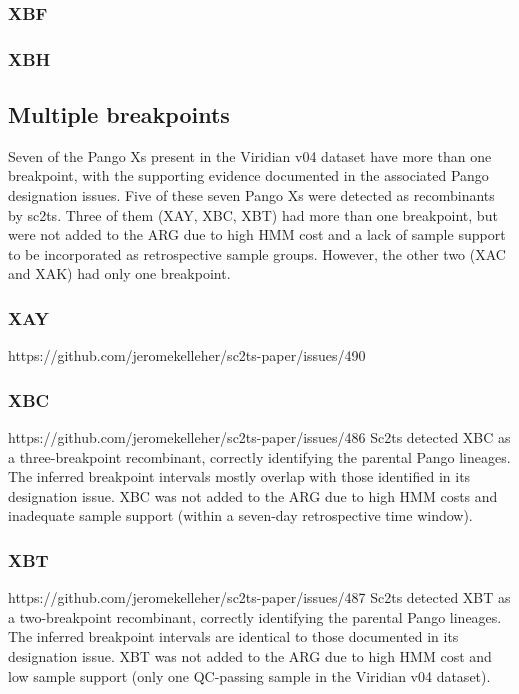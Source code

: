 \documentclass[12pt,letterpaper]{article}
\begin{document}
\subsubsection*{XBF}

\subsubsection*{XBH}

\subsection*{Multiple breakpoints}
Seven of the Pango Xs present in the Viridian v04 dataset have more than one breakpoint,
with the supporting evidence documented in the associated Pango designation issues.
Five of these seven Pango Xs were detected as recombinants by sc2ts.
Three of them (XAY, XBC, XBT) had more than one breakpoint,
but were not added to the ARG due to high HMM cost and
a lack of sample support to be incorporated as retrospective sample groups.
However, the other two (XAC and XAK) had only one breakpoint.

\subsubsection*{XAY}
https://github.com/jeromekelleher/sc2ts-paper/issues/490

\subsubsection*{XBC}
https://github.com/jeromekelleher/sc2ts-paper/issues/486
Sc2ts detected XBC as a three-breakpoint recombinant,
correctly identifying the parental Pango lineages.
The inferred breakpoint intervals mostly overlap with those identified in its designation issue.
XBC was not added to the ARG due to high HMM costs and inadequate sample support
(within a seven-day retrospective time window).

\subsubsection*{XBT}
https://github.com/jeromekelleher/sc2ts-paper/issues/487
Sc2ts detected XBT as a two-breakpoint recombinant,
correctly identifying the parental Pango lineages.
The inferred breakpoint intervals are identical to those documented in its designation issue.
XBT was not added to the ARG due to high HMM cost and low sample support
(only one QC-passing sample in the Viridian v04 dataset).
\end{document}
